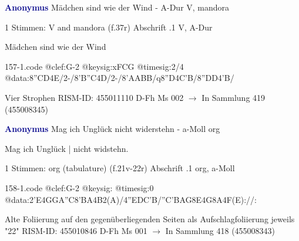 \documentclass[twocolumn]{book}
\begin{document}
\newline \par \vspace{7pt} \textcolor{darkblue}{\textbf{Anonymus  }}
\newline Mädchen sind wie der Wind - A-Dur
\newline V, mandora
\newline \begin{itshape}\end{itshape} 
\newline \textcolor{darkblue}{}  1 Stimmen: V and mandora  (f.37r)
\newline Abschrift
.1  V, A-Dur
\newline \begin{footnotesize} Mädchen sind wie der Wind \end{footnotesize}  
\begin{filecontents*}{157-1.code}
@clef:G-2
@keysig:xFCG
@timesig:2/4
@data:8''CD4E/2-/8'B''C4D/2-/8'AABB/q8''D4C'B/8''DD4'B/
\end{filecontents*}
\newline
%
\newline Vier Strophen
\newline RISM-ID: 455011110
\newline D-Fh  Ms 002
\newline $\rightarrow$ In Sammlung 419 (455008345)
      
\newline \par \vspace{7pt} \textcolor{darkblue}{\textbf{Anonymus  }}
\newline Mag ich Unglück nicht widerstehn - a-Moll
\newline org
\newline \begin{itshape}[f.21v, at left:] Mag ich Unglück | nicht widstehn.\end{itshape} 
\newline \textcolor{darkblue}{}  1 Stimmen: org (tabulature)  (f.21v-22r)
\newline Abschrift
.1  org, a-Moll  
\begin{filecontents*}{158-1.code}
@clef:G-2
@keysig:
@timesig:0
@data:2'E4GGA''C{8'BA}4B2(A)/4''EDC'B/''C'BAG8E4G8A4F(E)://:
\end{filecontents*}
\newline
%
\newline Alte Foliierung auf den gegenüberliegenden Seiten als Aufschlagfoliierung jeweils "22"
\newline RISM-ID: 455010846
\newline D-Fh  Ms 001
\newline $\rightarrow$ In Sammlung 418 (455008343)
      
\end{document}
